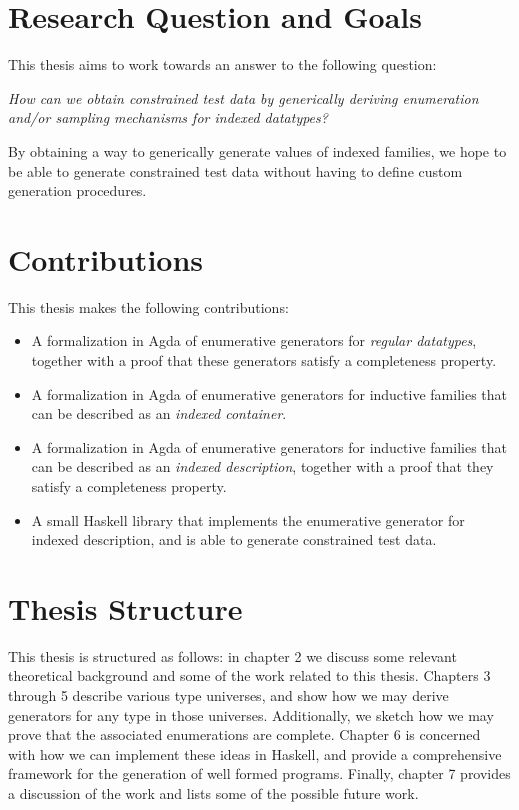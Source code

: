 \documentclass[a4paper,msc,twosized=semi]{uustthesis}
\begin{document}
\section{Research Question and Goals}

  This thesis aims to work towards an answer to the following question: 

  \begin{center} \emph{
    How can we obtain constrained test data by generically deriving enumeration and/or sampling mechanisms for indexed datatypes?
  }\end{center}

  By obtaining a way to generically generate values of indexed families, we hope to be able to generate constrained test data without having to define custom generation procedures.

\section{Contributions}

  This thesis makes the following contributions: 

  \begin{itemize}
    \item 
      A formalization in Agda of enumerative generators for \emph{regular datatypes}, together with a proof that these generators satisfy a completeness property. 

    \item 
      A formalization in Agda of enumerative generators for inductive families that can be described as an \emph{indexed container}. 

    \item 
      A formalization in Agda of enumerative generators for inductive families that can be described as an \emph{indexed description}, together with a proof that they satisfy a completeness property. 

    \item 
      A small Haskell library that implements the enumerative generator for indexed description, and is able to generate constrained test data. 
  \end{itemize}

\section{Thesis Structure}

  This thesis is structured as follows: in chapter 2 we discuss some relevant 
  theoretical background and some of the work related to 
  this thesis. Chapters 3 through 5 describe various type universes, and show how we may derive 
  generators for any type in those universes. Additionally, we sketch how we may prove 
  that the associated enumerations are complete. Chapter 6 is concerned with 
  how we can implement these ideas in Haskell, and provide a comprehensive framework 
  for the generation of well formed programs. Finally, chapter 7 provides a discussion 
  of the work and lists some of the possible future work.
\end{document}
